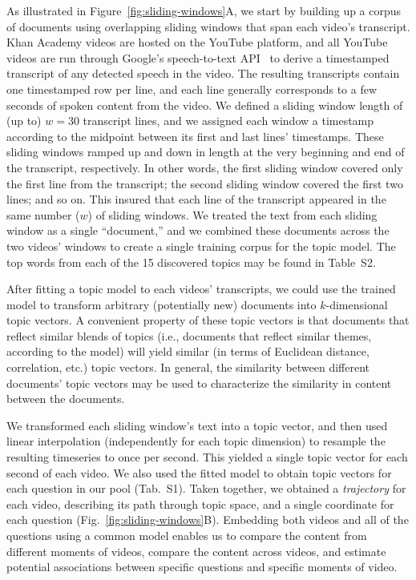 \documentclass[10pt]{article}
\newcommand{\questions}{S1}
\newcommand{\topics}{S2}
\begin{document}
As illustrated in Figure~\ref{fig:sliding-windows}A, we start by building up a
corpus of documents using overlapping sliding windows that span each video's
transcript. Khan Academy videos are hosted on the YouTube platform, and all
YouTube videos are run through Google's speech-to-text API~\citep{HalpEtal16}
to derive a timestamped transcript of any detected speech in the video. The
resulting transcripts contain one timestamped row per line, and each line
generally corresponds to a few seconds of spoken content from the video. We
defined a sliding window length of (up to) $w = 30$ transcript lines, and we
assigned each window a timestamp according to the midpoint between its first
and last lines' timestamps. These sliding windows ramped up and down in length
at the very beginning and end of the transcript, respectively. In other words,
the first sliding window covered only the first line from the transcript; the
second sliding window covered the first two lines; and so on. This insured that
each line of the transcript appeared in the same number ($w$) of sliding
windows. We treated the text from each sliding window as a single ``document,''
and we combined these documents across the two videos' windows to create a single
training corpus for the topic model.  The top words from each of the 15 discovered
topics may be found in Table~\topics.

After fitting a topic model to each videos' transcripts, we could use the
trained model to transform arbitrary (potentially new) documents into
$k$-dimensional topic vectors. A convenient property of these topic vectors is
that documents that reflect similar blends of topics (i.e., documents that
reflect similar themes, according to the model) will yield similar (in terms of
Euclidean distance, correlation, etc.) topic vectors. In general, the
similarity between different documents' topic vectors may be used to
characterize the similarity in content between the documents.

We transformed each sliding window's text into a topic vector, and then used
linear interpolation (independently for each topic dimension) to resample the
resulting timeseries to once per second. This yielded a single topic vector for
each second of each video. We also used the fitted model to obtain topic
vectors for each question in our pool (Tab.~\questions). Taken together, we
obtained a \textit{trajectory} for each video, describing its path through
topic space, and a single coordinate for each question
(Fig.~\ref{fig:sliding-windows}B). Embedding both videos and all of the
questions using a common model enables us to compare the content from different
moments of videos, compare the content across videos, and estimate potential
associations between specific questions and specific moments of video.
\end{document}
